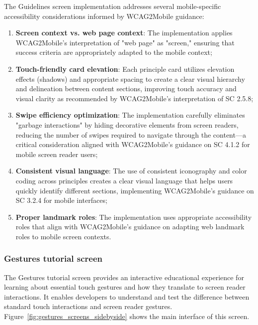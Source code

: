 The Guidelines screen implementation addresses several mobile-specific accessibility considerations informed by WCAG2Mobile guidance:

\begin{enumerate}
    \item \textbf{Screen context vs. web page context}: The implementation applies WCAG2Mobile's interpretation of "web page" as "screen," ensuring that success criteria are appropriately adapted to the mobile context;
    
    \item \textbf{Touch-friendly card elevation}: Each principle card utilizes elevation effects (shadows) and appropriate spacing to create a clear visual hierarchy and delineation between content sections, improving touch accuracy and visual clarity as recommended by WCAG2Mobile's interpretation of SC 2.5.8;
    
    \item \textbf{Swipe efficiency optimization}: The implementation carefully eliminates "garbage interactions" by hiding decorative elements from screen readers, reducing the number of swipes required to navigate through the content—a critical consideration aligned with WCAG2Mobile's guidance on SC 4.1.2 for mobile screen reader users;
    
    \item \textbf{Consistent visual language}: The use of consistent iconography and color coding across principles creates a clear visual language that helps users quickly identify different sections, implementing WCAG2Mobile's guidance on SC 3.2.4 for mobile interfaces;
    
    \item \textbf{Proper landmark roles}: The implementation uses appropriate accessibility roles that align with WCAG2Mobile's guidance on adapting web landmark roles to mobile screen contexts.
\end{enumerate}

\subsubsection{Gestures tutorial screen}
\label{subsubsec:gestures-tutorial}

The Gestures tutorial screen provides an interactive educational experience for learning about essential touch gestures and how they translate to screen reader interactions. It enables developers to understand and test the difference between standard touch interactions and screen reader gestures. Figure~\ref{fig:gestures_screens_sidebyside} shows the main interface of this screen.


